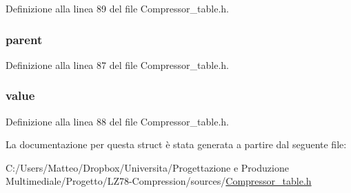 Definizione alla linea 89 del file Compressor\-\_\-table.\-h.

\hypertarget{struct__compressor__table__row__t_afcbfa18627869ca8efe6e3e9d1fcceb3}{
\subsubsection[{parent}]{ parent}}\label{struct__compressor__table__row__t_afcbfa18627869ca8efe6e3e9d1fcceb3}


Definizione alla linea 87 del file Compressor\-\_\-table.\-h.

\hypertarget{struct__compressor__table__row__t_ab069f2f375ef177b2e783fed615c001e}{
\subsubsection[{value}]{ value}}\label{struct__compressor__table__row__t_ab069f2f375ef177b2e783fed615c001e}


Definizione alla linea 88 del file Compressor\-\_\-table.\-h.



La documentazione per questa struct è stata generata a partire dal seguente file\-:\begin{DoxyCompactItemize}
\item 
C\-:/\-Users/\-Matteo/\-Dropbox/\-Universita/\-Progettazione e Produzione Multimediale/\-Progetto/\-L\-Z78-\/\-Compression/sources/\hyperlink{_compressor__table_8h}{Compressor\-\_\-table.\-h}\end{DoxyCompactItemize}
